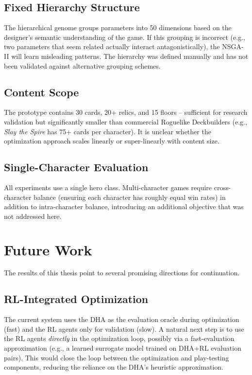 \subsection{Fixed Hierarchy Structure}

The hierarchical genome groups parameters into 50 dimensions based on the designer's semantic understanding of the game. If this grouping is incorrect (e.g., two parameters that seem related actually interact antagonistically), the NSGA-II will learn misleading patterns. The hierarchy was defined manually and has not been validated against alternative grouping schemes.

\subsection{Content Scope}

The prototype contains 30 cards, 20+ relics, and 15 floors -- sufficient for research validation but significantly smaller than commercial Roguelike Deckbuilders (e.g., \textit{Slay the Spire} has 75+ cards per character). It is unclear whether the optimization approach scales linearly or super-linearly with content size.

\subsection{Single-Character Evaluation}

All experiments use a single hero class. Multi-character games require cross-character balance (ensuring each character has roughly equal win rates) in addition to intra-character balance, introducing an additional objective that was not addressed here.

\section{Future Work}

The results of this thesis point to several promising directions for continuation.

\subsection{RL-Integrated Optimization}

The current system uses the DHA as the evaluation oracle during optimization (fast) and the RL agents only for validation (slow). A natural next step is to use the RL agents \textit{directly} in the optimization loop, possibly via a fast-evaluation approximation (e.g., a learned surrogate model trained on DHA+RL evaluation pairs). This would close the loop between the optimization and play-testing components, reducing the reliance on the DHA's heuristic approximation.

